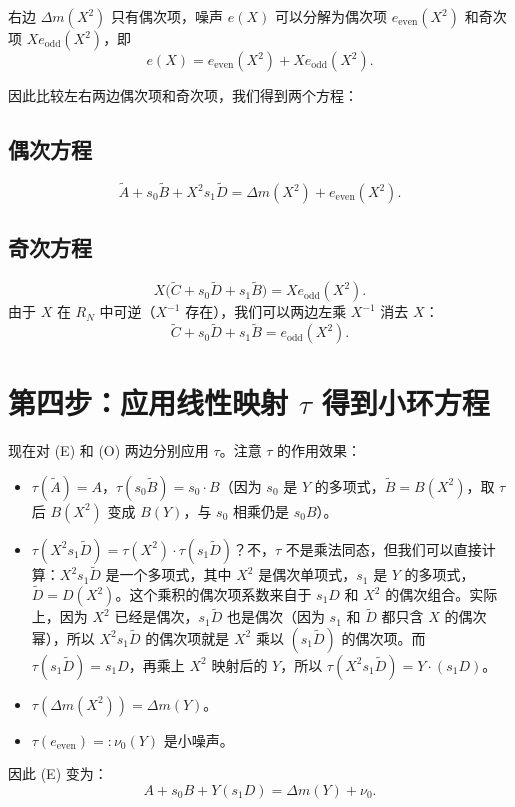 \documentclass{article}
\begin{document}
右边 $\Delta m(X^2)$ 只有偶次项，噪声 $e(X)$ 可以分解为偶次项 $e_{\text{even}}(X^2)$ 和奇次项 $X e_{\text{odd}}(X^2)$，即
\[
e(X) = e_{\text{even}}(X^2) + X e_{\text{odd}}(X^2).
\]

因此比较左右两边偶次项和奇次项，我们得到两个方程：

\subsection{偶次方程}
\[
\tilde{A} + s_0 \tilde{B} + X^2 s_1 \tilde{D} = \Delta m(X^2) + e_{\text{even}}(X^2). \tag{E}
\]

\subsection{奇次方程}
\[
X \big( \tilde{C} + s_0 \tilde{D} + s_1 \tilde{B} \big) = X e_{\text{odd}}(X^2).
\]
由于 $X$ 在 $R_N$ 中可逆（$X^{-1}$ 存在），我们可以两边左乘 $X^{-1}$ 消去 $X$：
\[
\tilde{C} + s_0 \tilde{D} + s_1 \tilde{B} = e_{\text{odd}}(X^2). \tag{O}
\]

\section{第四步：应用线性映射 $\tau$ 得到小环方程}

现在对 (E) 和 (O) 两边分别应用 $\tau$。注意 $\tau$ 的作用效果：
\begin{itemize}
  \item $\tau(\tilde{A}) = A$，$\tau(s_0 \tilde{B}) = s_0 \cdot B$（因为 $s_0$ 是 $Y$ 的多项式，$\tilde{B}=B(X^2)$，取 $\tau$ 后 $B(X^2)$ 变成 $B(Y)$，与 $s_0$ 相乘仍是 $s_0 B$）。
  \item $\tau(X^2 s_1 \tilde{D}) = \tau(X^2) \cdot \tau(s_1 \tilde{D})$？不，$\tau$ 不是乘法同态，但我们可以直接计算：$X^2 s_1 \tilde{D}$ 是一个多项式，其中 $X^2$ 是偶次单项式，$s_1$ 是 $Y$ 的多项式，$\tilde{D}=D(X^2)$。这个乘积的偶次项系数来自于 $s_1 D$ 和 $X^2$ 的偶次组合。实际上，因为 $X^2$ 已经是偶次，$s_1 \tilde{D}$ 也是偶次（因为 $s_1$ 和 $\tilde{D}$ 都只含 $X$ 的偶次幂），所以 $X^2 s_1 \tilde{D}$ 的偶次项就是 $X^2$ 乘以 $(s_1 \tilde{D})$ 的偶次项。而 $\tau(s_1 \tilde{D}) = s_1 D$，再乘上 $X^2$ 映射后的 $Y$，所以 $\tau(X^2 s_1 \tilde{D}) = Y \cdot (s_1 D)$。
  \item $\tau(\Delta m(X^2)) = \Delta m(Y)$。
  \item $\tau(e_{\text{even}}) =: \nu_0(Y)$ 是小噪声。
\end{itemize}
因此 (E) 变为：
\[
A + s_0 B + Y (s_1 D) = \Delta m(Y) + \nu_0. \tag{1}
\]
\end{document}
